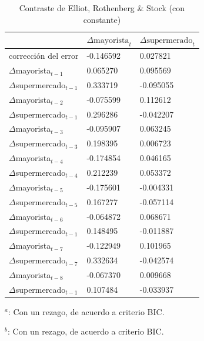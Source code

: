 \documentclass[12pt, twoside]{book}\usepackage[]{graphicx}\usepackage[]{color}
\numberwithin{equation}{section}
\numberwithin{theorem}{section}
\numberwithin{teorema}{section}
\numberwithin{defi}{section}
\numberwithin{prop}{section}
\numberwithin{defi}{section}
\theoremstyle{plain}
\begin{document}
\begin{table}[h]
\centering
\begin{threeparttable}
\caption{Contraste de Elliot, Rothenberg \& Stock (con constante)\label{fig5.6}}
\begin{tabular}{@{}lll@{}}
\toprule
 & $\Delta \text{mayorista}_{t} $ & $\Delta \text{supermerado}_{t}$ \\ 
 \midrule 
 $\text{corrección del error}$ & -0.146592   &  0.027821 \\     
$\Delta$mayorista$_{t-1}$   &   0.065270 &   0.095569  \\   
$\Delta$supermercado$_{t-1}$  & 0.333719  &  -0.095055 \\     
$\Delta$mayorista$_{t-2}$  & -0.075599  &   0.112612  \\   
$\Delta$supermercado$_{t-1}$  & 0.296286  &  -0.042207 \\     
$\Delta$mayorista$_{t-3}$ &  -0.095907  & 0.063245     \\
$\Delta$supermercado$_{t-3}$  & 0.198395  &   0.006723  \\   
$\Delta$mayorista$_{t-4}$   &  -0.174854  &   0.046165 \\     
$\Delta$supermercado$_{t-4}$  & 0.212239  &   0.053372  \\   
$\Delta$mayorista$_{t-5}$   &  -0.175601  &  -0.004331 \\     
$\Delta$supermercado$_{t-5}$  & 0.167277  &  -0.057114  \\   
$\Delta$mayorista$_{t-6}$   & -0.064872   &  0.068671 \\     
$\Delta$supermercado$_{t-1}$  & 0.148495  &  -0.011887 \\     
$\Delta$mayorista$_{t-7}$   &  -0.122949  &   0.101965 \\     
$\Delta$supermercado$_{t-7}$  & 0.332634  &  -0.042574  \\   
$\Delta$mayorista$_{t-8}$   &  -0.067370  &   0.009668  \\   
$\Delta$supermercado$_{t-1}$  & 0.107484  &  -0.033937  \\ 
\bottomrule
\end{tabular}
\label{tab-9}
\begin{tablenotes}
\small 
\item $^{a}$: Con un rezago, de acuerdo a criterio BIC. 
\item $^{b}$: Con un rezago, de acuerdo a criterio BIC. 
\end{tablenotes}
\end{threeparttable}
\end{table}
\end{document}
